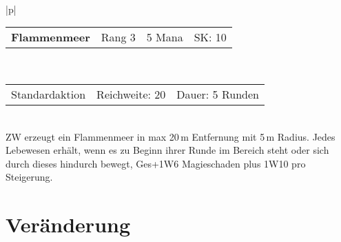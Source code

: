 \documentclass[../../Heldenanleitung2]{subfiles}
\begin{document}
\\\\\\
\begin{tabular}{|p{\textwidth}|}
\hline
\begin{tabularx}{\textwidth}{X|X|X|X}
\textbf{Flammenmeer} & Rang 3 & 5 Mana & SK: 10
\end{tabularx} \\ \hline
\begin{tabularx}{\textwidth}{X|X|X}
Standardaktion & Reichweite: 20 & Dauer: 5 Runden
\end{tabularx} \\ \hline
ZW erzeugt ein Flammenmeer in max 20\,m Entfernung mit 5\,m  Radius. Jedes Lebewesen erhält, wenn es zu Beginn ihrer Runde im Bereich steht oder sich durch dieses hindurch bewegt, Ges+1W6 Magieschaden plus 1W10 pro Steigerung.
\\ \hline
\end{tabular}

\section{Veränderung}
\end{document}
